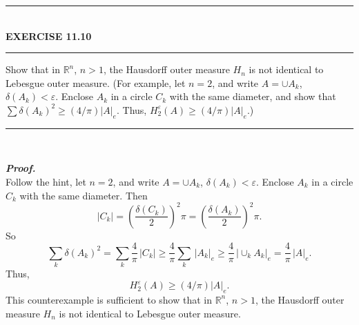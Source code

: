 \documentclass[a4paper,11pt]{article}
\begin{document}
	\begin{flushleft}
		\rule[-0.5ex]{17cm}{2pt}\\
			\textbf{EXERCISE 11.10}\\
		\rule[1.5ex]{17cm}{0.5pt}
			Show that in $\mathbb{R}^n$, $n > 1$, the Hausdorff outer measure $H_n$ is not identical to Lebesgue outer measure. (For example, let $n = 2$, and write $A = \cup A_k$, $\delta(A_k) < \varepsilon$. Enclose $A_k$ in a circle $C_k$ with the same diameter, and show that $\sum \delta(A_k)^2 \geq (4/\pi)|A|_e$. Thus, $H_2^\varepsilon(A) \geq (4/\pi)|A|_e$.)
		\rule[1.0ex]{17cm}{0.5pt}\
	\end{flushleft}
	\textbf{\textit{Proof.}}\\
		Follow the hint, let $n = 2$, and write $A = \cup A_k$, $\delta(A_k) < \varepsilon$. Enclose $A_k$ in a circle $C_k$ with the same diameter. Then
			$$|C_k|
			= \left(\frac{\delta(C_k)}{2}\right)^2 \pi
			= \left(\frac{\delta(A_k)}{2}\right)^2 \pi.$$
		So
			$$\sum_k \delta(A_k)^2
			= \sum_k \frac{4}{\pi}\,|C_k|
			\geq \frac{4}{\pi} \sum_k\,|A_k|_e
			\geq \frac{4}{\pi}\,|\cup_k A_k|_e
			= \frac{4}{\pi}\,|A|_e.$$
		Thus,
			$$H_2^\varepsilon(A) \geq (4/\pi)|A|_e.$$
		This counterexample is sufficient to show that in $\mathbb{R}^n$, $n > 1$, the Hausdorff outer measure $H_n$ is not identical to Lebesgue outer measure.\\
\end{document}
